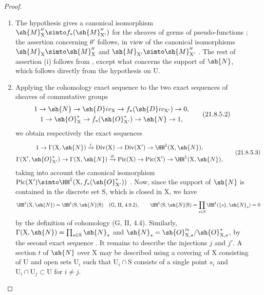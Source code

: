 \begin{proof}
\begin{enumerate}[label=(\roman*)]
  \item The hypothesis gives a canonical isomorphism $\sh{M}''_\mathrm{X}\simto f_*(\sh{M}''_{\mathrm{X}'})$ for the sheaves of germs of pseudo-functions ; the assertion concerning $\theta'$ follows, in view of the canonical isomorphisms $\sh{M}_\mathrm{X}\simto\sh{M}''_\mathrm{X}$ and $\sh{M}_{\mathrm{X}'}\simto\sh{M}''_{\mathrm{X}'}$ .
The rest of assertion (i) follows from , except what concerns the support of $\sh{N}$, which follows directly from the hypothesis on $\mathrm{U}$.

  \item Applying the cohomology exact sequence to the two exact sequences of sheaves of commutative groups
\[
\label{IV.21.8.5.2}
\begin{gathered}
  1\to\sh{N}\to\sh{D}iv_\mathrm{X}\to f_*(\sh{D}iv_{\mathrm{X}'})\to 0,\\
  1\to\sh{O}^*_\mathrm{X}\to f_*(\sh{O}^*_{\mathrm{X}'})\to\sh{N}\to 1,
\end{gathered}
  \tag{21.8.5.2}
\]
we obtain respectively the exact sequences
\[
\label{IV.21.8.5.3}
\begin{gathered}
  1\to\Gamma(\mathrm{X},\sh{N})\xrightarrow{j}\operatorname{Div}(\mathrm{X})\to\operatorname{Div}(\mathrm{X}')\to\HH^1(\mathrm{X},\sh{N}),\\
  \Gamma(\mathrm{X}',\sh{O}^*_{\mathrm{X}'})\to\Gamma(\mathrm{X},\sh{N})\xrightarrow{\partial}\operatorname{Pic}(\mathrm{X})\to\operatorname{Pic}(\mathrm{X}')\to\HH^1(\mathrm{X},\sh{N}),
\end{gathered}
  \tag{21.8.5.3}
\]
taking into account the canonical isomorphism $\operatorname{Pic}(\mathrm{X}')\simto\HH^1(\mathrm{X},f_*(\sh{O}^*_{\mathrm{X}'}))$ .
Now, since the support of $\sh{N}$ is contained in the discrete set $\mathrm{S}$, which is closed in $\mathrm{X}$, we have
\[
  \HH^1(\mathrm{X},\sh{N})=\HH^1(\mathrm{S},\sh{N}|\mathrm{S}) \quad\text{(G, II, 4.9.2)},
  \qquad
  \HH^1(\mathrm{S},\sh{N}|\mathrm{S})=\prod_{s\in\mathrm{S}}\HH^1(\{s\},\sh{N}_s)=0
\]
by the definition of cohomology (G, II, 4.4).
Similarly, $\Gamma(\mathrm{X},\sh{N})=\prod_{s\in\mathrm{S}}\sh{N}_s$ and $\sh{N}_s=\sh{O}'^{*}_{\mathrm{X},s}/\sh{O}^*_{\mathrm{X},s}$, by the second exact sequence .
It remains to describe the injections $j$ and $j'$.
A section $t$ of $\sh{N}$ over $\mathrm{X}$ may be described using a covering of $\mathrm{X}$ consisting of $\mathrm{U}$ and open sets $\mathrm{U}_i$ such that $\mathrm{U}_i\cap\mathrm{S}$ consists of a single point $s_i$ and $\mathrm{U}_i\cap\mathrm{U}_j\subset\mathrm{U}$ for $i\neq j$.

\end{enumerate}
\end{proof}
